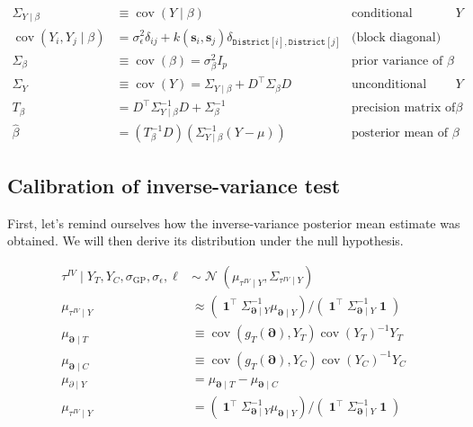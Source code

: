 \documentclass[letter]{article}
\newcommand{\genericdel}[3]{%
      \left#1#3\right#2
    }
\newcommand{\del}[1]{\genericdel(){#1}}
\newcommand{\sbr}[1]{\genericdel[]{#1}}
\DeclareMathOperator{\cov}{{cov}}
\DeclareMathOperator{\normal}{\mathcal{N}}
\DeclareMathOperator{\ones}{\mathbf{1}}
\newcommand{\district}{\mathtt{District}}
\newcommand{\trans}{^{\intercal}}
\newcommand{\sigmaf}{\sigma_{\mathrm{GP}}}
\newcommand{\sigman}{\sigma_{\epsilon}}
\newcommand{\svec}{\mathbold{s}}
\newcommand{\boundary}{\partial}
\newcommand{\sentinels}{\bm{\boundary}}
\newcommand{\invvar}{\tau^{IV}}
\begin{document}
\begin{equation}
\begin{aligned}
    \Sigma_{Y \mid \beta} &\equiv \cov\del{Y \mid \beta } 
        & \text{conditional variance of $Y$} \\
    \cov\del{Y_i , Y_j \mid \beta } &= \sigman^2 \delta_{ij} + k\del{\svec_i,\svec_j} \delta_{\district\sbr{i},\district\sbr{j}} & \text{(block diagonal)}\\
    \Sigma_\beta &\equiv \cov\del{\beta} = \sigma_\beta^2 I_p
        & \text{prior variance of $\beta$} \\
    \Sigma_Y &\equiv \cov\del{Y} = \Sigma_{Y \mid \beta} + D\trans \Sigma_\beta D
        & \text{unconditional variance of $Y$} \\
    T_\beta &= D\trans \Sigma_{Y \mid \beta}^{-1} D + \Sigma^{-1}_\beta 
        & \text{precision matrix of $\beta$} \\
    \hat\beta &= \del{T_\beta^{-1} D} \del{ \Sigma_{Y \mid \beta}^{-1} \del{Y-\mu}}
        & \text{posterior mean of $\beta$}
\end{aligned}
\end{equation}
    


    	\subsection{Calibration of inverse-variance
test}\label{calibration-of-inverse-variance-test}

First, let's remind ourselves how the inverse-variance posterior mean
estimate was obtained. We will then derive its distribution under the
null hypothesis.

\begin{equation}\begin{split}
    \invvar \mid Y_T, Y_C, \sigmaf, \sigman, \ell &\sim \normal\del{\mu_{\invvar \mid Y}, \Sigma_{\invvar \mid Y}} \\
    \mu_{\invvar \mid Y} &\approx \del{\ones\trans \Sigma_{\sentinels \mid Y}^{-1} \mu_{\sentinels \mid Y}} \big/ \del{\ones\trans \Sigma_{\sentinels \mid Y}^{-1} \ones}  \\
    \mu_{\sentinels \mid T} &\equiv \cov\del{g_T(\sentinels), Y_T} \cov\del{Y_T}^{-1}  Y_T \\
    \mu_{\sentinels \mid C} &\equiv \cov\del{g_T(\sentinels), Y_C} \cov\del{Y_C}^{-1}  Y_C \\
    \mu_{\boundary \mid Y} &=  \mu_{\sentinels \mid T} - \mu_{\sentinels \mid C} \\
    \mu_{\invvar \mid Y} &= \del{\ones\trans \Sigma_{\sentinels \mid Y}^{-1} \mu_{\sentinels \mid Y}} \big/ \del{\ones\trans \Sigma_{\sentinels \mid Y}^{-1} \ones}  \\
\end{split}\end{equation}
    
\end{document}
